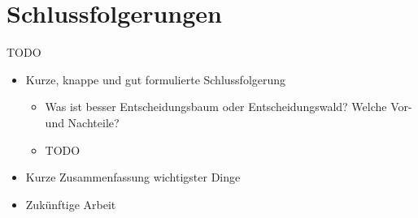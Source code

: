 \chapter{Schlussfolgerungen}
TODO\cite{SAMPLE}

\begin{itemize}
    \item Kurze, knappe und gut formulierte Schlussfolgerung
    \begin{itemize}
        \item Was ist besser Entscheidungsbaum oder Entscheidungswald? Welche Vor- und Nachteile?
        \item TODO
    \end{itemize}
    \item Kurze Zusammenfassung wichtigster Dinge
    \item Zukünftige Arbeit
\end{itemize}